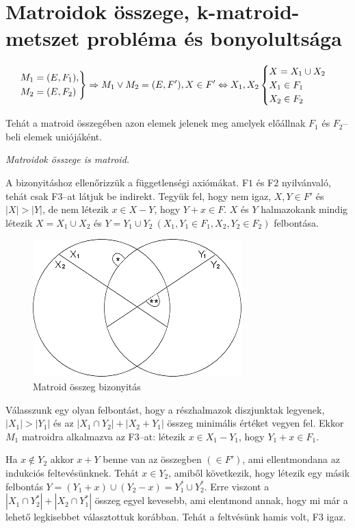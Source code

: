 \section{Matroidok összege, k-matroid-metszet probléma és bonyolultsága}

\[
\begin{rcases}
M_1=(E,F_1), \\
M_2=(E,F_2)
\end{rcases} 
\Rightarrow
M_1 \vee M_2  = (E,F'), X \in F' \Leftrightarrow X_1, X_2 
\begin{cases}
X=X_1 \cup X_2 \\
X_1 \in F_1\\
X_2 \in F_2
\end{cases}
\]

Tehát a matroid összegében azon elemek jelenek meg amelyek előállnak $F_1$ és
$F_2$--beli elemek uniójáként. 

\vspace{0.4cm}
\emph{Matroidok összege is matroid.}
\vspace{0.4cm}

A bizonyitáshoz ellenőrizzük a függetlenségi axiómákat. F$1$ és F$2$
nyilvánvaló, tehát csak F$3$--at látjuk be indirekt. Tegyük fel, hogy nem igaz, $X,Y \in F'$
és $|X|>|Y|$, de nem létezik $x \in X-Y$, hogy $Y+x \in F$. $X$ és $Y$
halmazokank mindig létezik $X=X_1 \cup X_2$ és $Y=Y_1
\cup Y_2 ~(X_1, Y_1 \in F_1, X_2, Y_2 \in F_2)$ felbontása.

\begin{figure}[htbp]
\centering
\includegraphics[width=0.4\linewidth]{./kepek/matroidosszeg.png}
\caption{Matroid összeg bizonyitás}\label{fig:Unif}
\end{figure}

Válasszunk egy olyan felbontást, hogy a részhalmazok diszjunktak legyenek,
$|X_1|>|Y_1|$ és az $|X_1 \cap Y_2|+|X_2+Y_1|$ összeg minimális értéket vegyen
fel. Ekkor $M_1$ matroidra alkalmazva az F$3$--at: létezik $x \in X_1-Y_1$,
hogy $Y_1+x \in F_1$.

Ha $x \not \in Y_2$ akkor $x+Y $ benne van az összegben $(\in F')$, ami
ellentmondana az indukciós feltevésünknek. Tehát $x \in Y_2$, amiből következik,
hogy létezik egy másik felbontás $Y=(Y_1+x) \cup (Y_2 -x)=Y_1^* \cup Y_2^*$.
Erre viszont a $|X_1\cap Y_2^*|+|X_2 \cap Y_1^*|$ összeg egyel kevesebb, ami
elentmond annak, hogy mi már a lehető legkisebbet választottuk korábban. Tehát a
feltvésünk hamis volt, F$3$ igaz.

